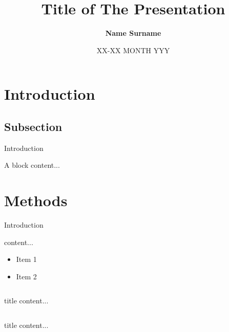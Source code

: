 \documentclass[10pt, aspectratio=169, handout]{aiaspres}
\author{\textbf{Name Surname}}
\title{Title of The Presentation}
\date{XX-XX MONTH YYY}
\begin{document}
	
	\maketitle

	\section{Introduction}
	\subsection{Subsection}
	\begin{frame}{Introduction}
		\onslide<2->\begin{block}{A block}
			content...
		\end{block}
	\end{frame}
	
	\section{Methods}
	\begin{frame}{Introduction}
		\begin{block}{content...}
			\begin{itemize}
				\item Item 1
				\item Item 2
			\end{itemize}
		\end{block}
		
		\begin{fullcols}
			\begin{column}[t]{0.49\linewidth}
				\begin{block}{title}
					content...
				\end{block}
			\end{column}
			
			\begin{column}[t]{0.49\linewidth}
				\begin{block}{title}
					content...
				\end{block}
			\end{column}
		\end{fullcols}
	\end{frame}
	
\end{document}
